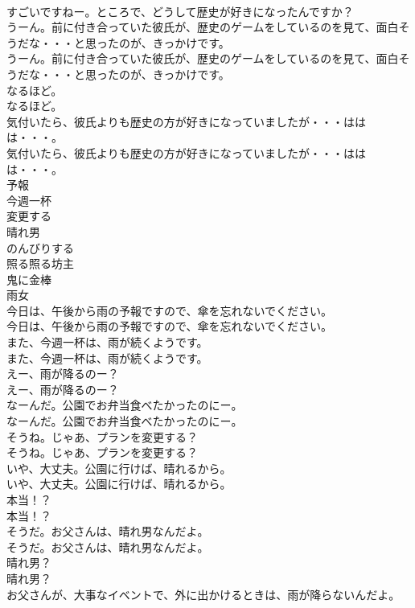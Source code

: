 \documentclass[8pt]{extreport}
\begin{document}
\begin{CJK}{UTF8}{min}
\\	すごいですねー。ところで、どうして歴史が好きになったんですか？ 
\\	うーん。前に付き合っていた彼氏が、歴史のゲームをしているのを見て、面白そうだな・・・と思ったのが、きっかけです。	
\\	うーん。前に付き合っていた彼氏が、歴史のゲームをしているのを見て、面白そうだな・・・と思ったのが、きっかけです。 
\\	なるほど。	
\\	なるほど。 
\\	気付いたら、彼氏よりも歴史の方が好きになっていましたが・・・ははは・・・。	
\\	気付いたら、彼氏よりも歴史の方が好きになっていましたが・・・ははは・・・。 
\\	予報
\\	今週一杯
\\	変更する
\\	晴れ男
\\	のんびりする
\\	照る照る坊主
\\	鬼に金棒
\\	雨女
\\	今日は、午後から雨の予報ですので、傘を忘れないでください。	
\\	今日は、午後から雨の予報ですので、傘を忘れないでください。 
\\	また、今週一杯は、雨が続くようです。	
\\	また、今週一杯は、雨が続くようです。 
\\	えー、雨が降るのー？	
\\	えー、雨が降るのー？ 
\\	なーんだ。公園でお弁当食べたかったのにー。	
\\	なーんだ。公園でお弁当食べたかったのにー。 
\\	そうね。じゃあ、プランを変更する？	
\\	そうね。じゃあ、プランを変更する？ 
\\	いや、大丈夫。公園に行けば、晴れるから。	
\\	いや、大丈夫。公園に行けば、晴れるから。 
\\	本当！？	
\\	本当！？ 
\\	そうだ。お父さんは、晴れ男なんだよ。	
\\	そうだ。お父さんは、晴れ男なんだよ。 
\\	晴れ男？	
\\	晴れ男？ 
\\	お父さんが、大事なイベントで、外に出かけるときは、雨が降らないんだよ。	

\end{CJK}
\end{document}

